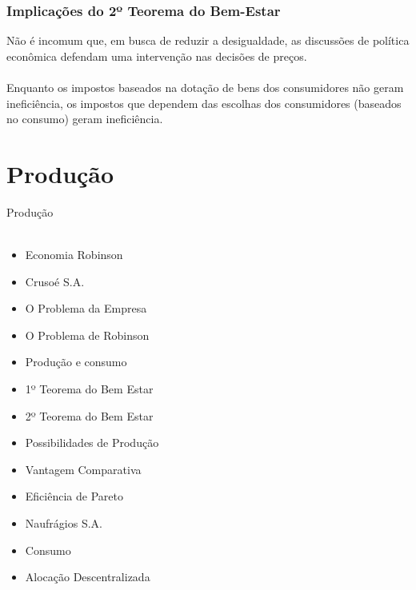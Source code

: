 \documentclass{beamer}[10]
\begin{document}
\begin{frame}
	\frametitle{Implicações do 2º Teorema do Bem-Estar}

	Não é incomum que, em busca de reduzir a desigualdade, as discussões de política econômica defendam uma intervenção nas decisões de preços.
	\\~\\
	Enquanto os impostos baseados na dotação de bens dos consumidores não geram ineficiência, os impostos que dependem das escolhas dos consumidores (baseados no consumo) geram ineficiência.

\end{frame}

\section[Produção]{Produção}
\begin{frame}
	\huge Produção \normalsize
	\\~\\
	\begin{multicols*}{2}		
		\begin{itemize}
			\item Economia Robinson
			\item Crusoé S.A.
			\item O Problema da Empresa
			\item O Problema de Robinson
			\item Produção e consumo
			\item 1º Teorema do Bem Estar
			\item 2º Teorema do Bem Estar
			\item Possibilidades de Produção
			\item Vantagem Comparativa
			\item Eficiência de Pareto
			\item Naufrágios S.A.
			\item Consumo
			\item Alocação Descentralizada
		\end{itemize}
	\end{multicols*}
\end{frame}
\end{document}
